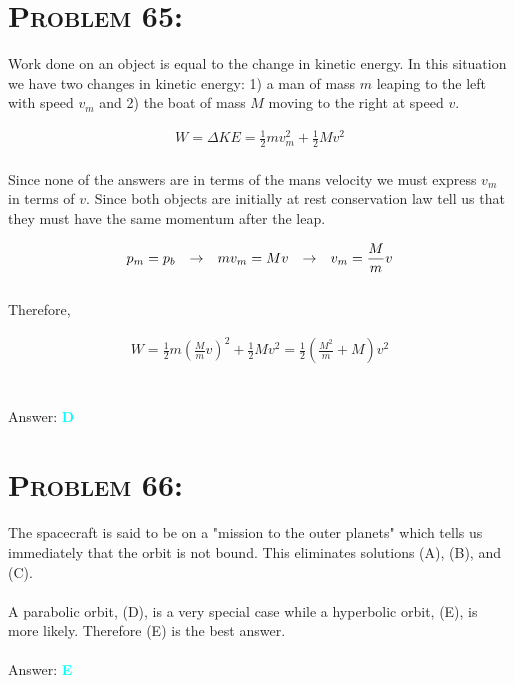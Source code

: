 \documentclass{article}
\begin{document}

\section{\textsc{Problem 65:}} Work done on an object is equal to the change in kinetic energy. In this situation we have two changes in kinetic energy: 1) a man of mass $m$ leaping to the left with speed $v_{m}$ and 2) the boat of mass $M$ moving to the right at speed $v$.

\begin{gather}
W = \Delta KE = \frac{1}{2} m v_{m}^{2} + \frac{1}{2} Mv^{2}
\end{gather}
\\
Since none of the answers are in terms of the mans velocity we must express $v_{m}$ in terms of $v$. Since both objects are initially at rest conservation law tell us that they must have the same momentum after the leap.

\begin{gather}
p_{m} = p_{b}\hspace{.1in} \rightarrow \hspace{.1in} 
mv_{m} = Mv \hspace{.1in} \rightarrow \hspace{.1in} v_{m} = \frac{M}{m}\nonumber v
\end{gather}
\\
Therefore,

\begin{gather}
W = \frac{1}{2} m \left(  \frac{M}{m}\nonumber v  \right)^{2} + \frac{1}{2} Mv^{2} 
= \boxed{\frac{1}{2} \left( \frac{M^{2}}{m} + M  \right)v^{2}}
\end{gather}
\\\\
Answer: \textbf{\textcolor{cyan}D}\\


\section{\textsc{Problem 66:}} The spacecraft is said to be on a "mission to the outer planets" which tells us immediately that the orbit is not bound. This eliminates solutions (A), (B), and (C).\\
\\
A parabolic orbit, (D), is a very special case while a hyperbolic orbit, (E), is more likely. Therefore (E) is the best answer.
\\\\
Answer: \textbf{\textcolor{cyan}E}\\
\end{document}
